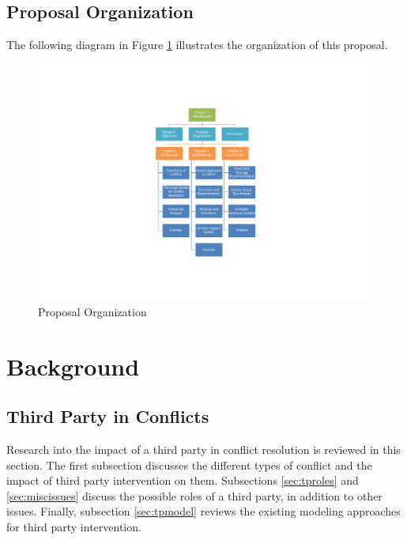 \documentclass[letterpaper,12pt,titlepage,oneside,final]{book}
\begin{document}
\section{Proposal Organization}

The following diagram in Figure \ref{fig:proposal} illustrates the organization of this proposal.

\begin{center}
\begin{figure}[h!]
\centering
\includegraphics[scale=1]{PDF-IMG/proposalorganization.pdf}

\caption{Proposal Organization}

\label{fig:proposal}
\end{figure}
\end{center}





\chapter{Background}




\section{Third Party in Conflicts}

Research into the impact of a third party in conflict resolution is reviewed in this section. The first subsection discusses the different types of conflict and the impact of third party intervention on them. Subsections \ref{sec:tproles} and \ref{sec:miscissues} discuss the possible roles of a third party, in addition to other issues. Finally, subsection \ref{sec:tpmodel} reviews the existing modeling approaches for third party intervention.
\end{document}
